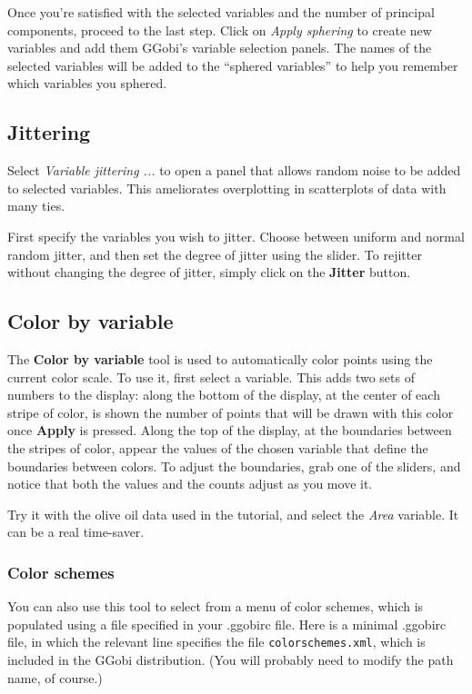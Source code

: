\documentclass[11pt]{article}
\begin{document}
Once you're satisfied with the selected variables and the number of
principal components, proceed to the last step.  Click on {\em Apply
sphering} to create new variables and add them GGobi's variable selection
panels.  The names of the selected variables will be added to the
``sphered variables'' to help you remember which variables you sphered.

\subsection{Jittering}

Select {\em Variable jittering ...} to open a panel that allows
random noise to be added to selected variables.  This ameliorates
overplotting in scatterplots of data with many ties.

First specify the variables you wish to jitter.  Choose between uniform
and normal random jitter, and then set the degree of jitter using the
slider.  To rejitter without changing the degree of jitter, simply click
on the {\bf Jitter} button.

\subsection{Color by variable}
\label{slbl:ColorByVariable}

The {\bf Color by variable} tool is used to automatically color points
using the current color scale.  To use it, first select a variable.
This adds two sets of numbers to the display:  along the bottom of the
display, at the center of each stripe of color, is shown the number of
points that will be drawn with this color once {\bf Apply} is pressed.
Along the top of the display, at the boundaries between the stripes of
color, appear the values of the chosen variable that define the boundaries
between colors.  To adjust the boundaries, grab one of the sliders,
and notice that both the values and the counts adjust as you move it.

Try it with the olive oil data used in the tutorial, and select the {\it
Area} variable.  It can be a real time-saver.

\subsubsection{Color schemes}

You can also use this tool to select from a menu of color schemes,
which is populated using a file specified in your .ggobirc file.
Here is a minimal .ggobirc file, in which the relevant line specifies
the file {\tt colorschemes.xml}, which is included in the GGobi
distribution.  (You will probably need to modify the path name, of
course.)
\end{document}
